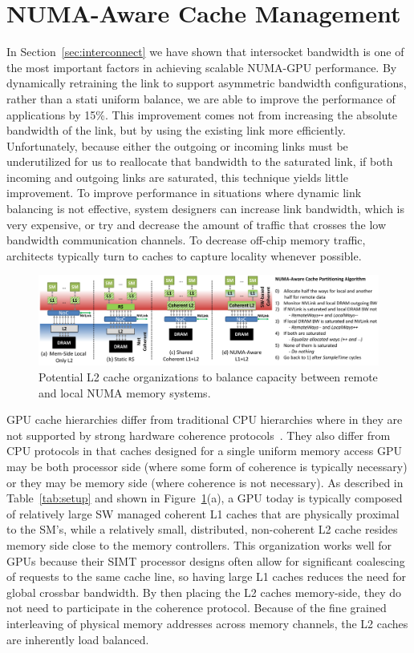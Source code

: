 \section{NUMA-Aware Cache Management}
\label{caching}
In Section~\ref{sec:interconnect} we have shown that intersocket bandwidth is one
of the most important factors in achieving scalable NUMA-GPU performance. By
dynamically retraining the link to support asymmetric bandwidth configurations,
rather than a stati uniform balance, we are able to improve the performance
of applications by 15\%.  This improvement comes not from increasing the
absolute bandwidth of the link, but by using the existing link more efficiently.
Unfortunately, because either the outgoing or incoming links must be underutilized
for us to reallocate that bandwidth to the saturated link, if both incoming and
outgoing links are saturated, this technique yields little improvement.
To improve performance in situations where dynamic link balancing is not effective,
system designers can increase link bandwidth, which is very expensive,
or try and decrease the amount of traffic that crosses the low bandwidth
communication channels.  To decrease off-chip memory traffic, architects typically
turn to caches to capture locality whenever possible.

\begin{figure}[t]
    \centering
    \includegraphics[width=1.0\textwidth]{figures/cache_configurations_static_dynamic.pdf}
    \caption{Potential L2 cache organizations to balance capacity between remote and
    local NUMA memory systems.}
    \label{fig:cacheorg}
\end{figure}

GPU cache hierarchies differ from traditional CPU hierarchies where in they are
not supported by strong hardware coherence protocols~\cite{XXX}.  They also differ
from CPU protocols in that caches designed for a single uniform memory access GPU
may be both processor side (where some form of coherence is typically necessary)
or they may be memory side (where coherence is not necessary).  As described in
Table~\ref{tab:setup} and shown in Figure~\ref{fig:cacheorg}(a), a GPU today is
typically composed of relatively large SW managed coherent L1 caches that are 
physically proximal to the SM's, while a relatively small, distributed, non-coherent 
L2 cache resides memory side close to the memory controllers.  This
organization works well for GPUs because their SIMT processor designs often allow
for significant coalescing of requests to the same cache line, so having large
L1 caches reduces the need for global crossbar bandwidth.  By then placing the L2
caches memory-side, they do not need to participate in the coherence protocol.  Because of the fine grained interleaving of physical memory addresses
across memory channels, the L2 caches are inherently load balanced.

